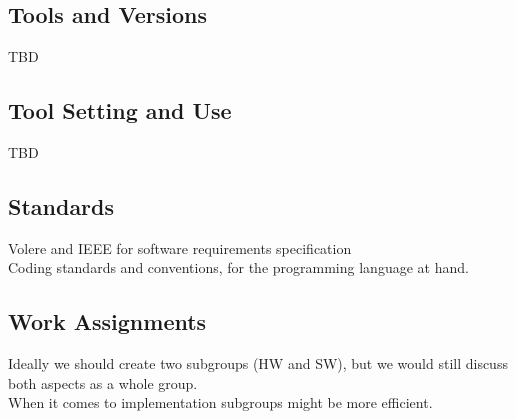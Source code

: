 \documentclass [12pt]{article}
\begin{document}
\subsection{Tools and Versions}
TBD

\subsection{Tool Setting and Use}
TBD


\subsection{Standards}
Volere and IEEE for software requirements specification \\
Coding standards and conventions, for the programming language at hand.\\

\subsection{Work Assignments}

Ideally we should create two subgroups (HW and SW), but we would still
discuss both aspects as a whole group.\\ When it comes to implementation subgroups might be more efficient. \\
\end{document}
